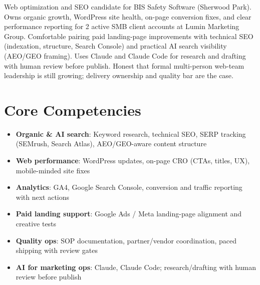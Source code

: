 \documentclass[11pt,a4paper,sans]{moderncv}
\begin{document}
\makecvtitle

\vspace{6pt}
\small{Web optimization and SEO candidate for BIS Safety Software (Sherwood Park). Owns organic growth, WordPress site health, on-page conversion fixes, and clear performance reporting for 2 active SMB client accounts at Lumin Marketing Group. Comfortable pairing paid landing-page improvements with technical SEO (indexation, structure, Search Console) and practical AI search visibility (AEO/GEO framing). Uses Claude and Claude Code for research and drafting with human review before publish. Honest that formal multi-person web-team leadership is still growing; delivery ownership and quality bar are the case.}

\section{Core Competencies}
\vspace{1pt}
\begin{itemize}
\item \textbf{Organic \& AI search}: Keyword research, technical SEO, SERP tracking (SEMrush, Search Atlas), AEO/GEO-aware content structure
\item \textbf{Web performance}: WordPress updates, on-page CRO (CTAs, titles, UX), mobile-minded site fixes
\item \textbf{Analytics}: GA4, Google Search Console, conversion and traffic reporting with next actions
\item \textbf{Paid landing support}: Google Ads / Meta landing-page alignment and creative tests
\item \textbf{Quality ops}: SOP documentation, partner/vendor coordination, paced shipping with review gates
\item \textbf{AI for marketing ops}: Claude, Claude Code; research/drafting with human review before publish
\end{itemize}
\end{document}
